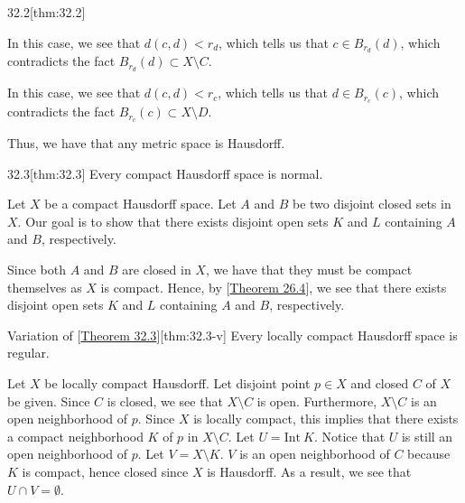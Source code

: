 \begin{thmBox}{32.2}[thm:32.2]
\begin{proofBox}
        \baseSkip
        In this case, we see that \( d( c, d ) < r_{ d } \), which tells us that
        \( c \in B_{ r_{ d } }( d ) \), which contradicts the fact
        \( B_{ r_{ d } }( d ) \subset X \setminus C \).

        \baseSkip
        In this case, we see that \( d( c, d ) < r_{ c } \), which tells us that
        \( d \in B_{ r_{ c } }( c ) \), which contradicts the fact
        \( B_{ r_{ c } }( c ) \subset X \setminus D \).

        \baseSkip

        Thus, we have that any metric space is Hausdorff.
    \end{proofBox}  
\end{thmBox}

\begin{thmBox}{32.3}[thm:32.3]
    Every compact Hausdorff space is normal.

    \baseRule

    \begin{proofBox}
        Let \( X \) be a compact Hausdorff space.
        Let \( A \) and \( B \) be two disjoint closed sets in \( X \).
        Our goal is to show that there exists disjoint open sets \( K \) and \( L \)
        containing \( A \) and \( B \), respectively. 
        
        \baseSkip

        Since both \( A \) and \( B \) are closed in \( X \), we have that they must be
        compact themselves as \( X \) is compact.
        Hence, by [\hyperlink{thm:26.4}{Theorem 26.4}], we see that there exists 
        disjoint open sets \( K \) and \( L \) containing \( A \) and \( B \), 
        respectively.
    \end{proofBox}
\end{thmBox}

\begin{thmBox}{Variation of [\hyperlink{thm:32.3}{Theorem 32.3}]}[thm:32.3-v]
    Every locally compact Hausdorff space is regular.

    \baseRule

    \begin{proofBox}
        Let \( X \) be locally compact Hausdorff.
        Let disjoint point \( p \in X \) and closed \( C \) of \( X \) be given.
        Since \( C \) is closed, we see that \( X \setminus C \) is open.
        Furthermore, \( X \setminus C \) is an open neighborhood of \( p \).
        Since \( X \) is locally compact, this implies that there exists a 
        compact neighborhood \( K \) of \( p \) in \( X \setminus C \).
        Let \( U = \mathrm{Int} \ K \).
        Notice that \( U \) is still an open neighborhood of \( p \).
        Let \( V = X \setminus K \).
        \( V \) is an open neighborhood of \( C \) because \( K \) is 
        compact, hence closed since \( X \) is Hausdorff.
        As a result, we see that \( U \cap V = \emptyset \).
    \end{proofBox}
\end{thmBox}

